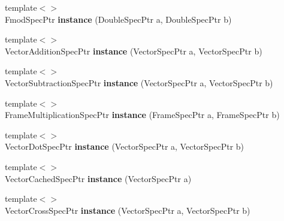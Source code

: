 \begin{DoxyCompactItemize}
\item 
\hypertarget{namespacegiskard__suturo_a3be9d26c03ffd1efaa4b700f384c2a8c}{{\footnotesize template$<$$>$ }\\Fmod\-Spec\-Ptr {\bfseries instance} (Double\-Spec\-Ptr a, Double\-Spec\-Ptr b)}\label{namespacegiskard__suturo_a3be9d26c03ffd1efaa4b700f384c2a8c}

\item 
\hypertarget{namespacegiskard__suturo_af37648e58c1294b09a0b7258a64cc095}{{\footnotesize template$<$$>$ }\\Vector\-Addition\-Spec\-Ptr {\bfseries instance} (Vector\-Spec\-Ptr a, Vector\-Spec\-Ptr b)}\label{namespacegiskard__suturo_af37648e58c1294b09a0b7258a64cc095}

\item 
\hypertarget{namespacegiskard__suturo_aa8e290f5a4efe17e2963c7c64c804f76}{{\footnotesize template$<$$>$ }\\Vector\-Subtraction\-Spec\-Ptr {\bfseries instance} (Vector\-Spec\-Ptr a, Vector\-Spec\-Ptr b)}\label{namespacegiskard__suturo_aa8e290f5a4efe17e2963c7c64c804f76}

\item 
\hypertarget{namespacegiskard__suturo_aa51fa0e45bc25b41289c9a6f0ad1d44f}{{\footnotesize template$<$$>$ }\\Frame\-Multiplication\-Spec\-Ptr {\bfseries instance} (Frame\-Spec\-Ptr a, Frame\-Spec\-Ptr b)}\label{namespacegiskard__suturo_aa51fa0e45bc25b41289c9a6f0ad1d44f}

\item 
\hypertarget{namespacegiskard__suturo_ab28a388093b91177f78dee89124319ec}{{\footnotesize template$<$$>$ }\\Vector\-Dot\-Spec\-Ptr {\bfseries instance} (Vector\-Spec\-Ptr a, Vector\-Spec\-Ptr b)}\label{namespacegiskard__suturo_ab28a388093b91177f78dee89124319ec}

\item 
\hypertarget{namespacegiskard__suturo_a02f7e24c2fe75e1c5016d85806869a6b}{{\footnotesize template$<$$>$ }\\Vector\-Cached\-Spec\-Ptr {\bfseries instance} (Vector\-Spec\-Ptr a)}\label{namespacegiskard__suturo_a02f7e24c2fe75e1c5016d85806869a6b}

\item 
\hypertarget{namespacegiskard__suturo_a06a9305ed0916b823d80092b07c742f1}{{\footnotesize template$<$$>$ }\\Vector\-Cross\-Spec\-Ptr {\bfseries instance} (Vector\-Spec\-Ptr a, Vector\-Spec\-Ptr b)}\label{namespacegiskard__suturo_a06a9305ed0916b823d80092b07c742f1}


\end{DoxyCompactItemize}
